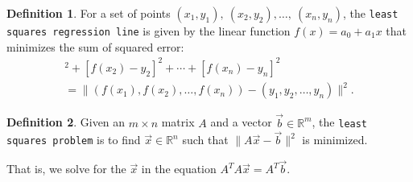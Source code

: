 \documentclass{beamer}
\newcommand{\R}{\mathbb{R}}
\newcommand{\fn}{\insertframenumber}
\theoremstyle{definition}
\newtheorem*{defn}{Definition}
\renewcommand{\emph}[1]{{\color{blue}\texttt{#1}}}
\begin{document}
\begin{frame}{\fn}
\begin{defn}
	For a set of points $(x_1,y_1),\ (x_2,y_2),\dots,\ (x_n,y_n)$, the \emph{least squares regression line} is given by the linear function $f(x)=a_0+a_1x$ that minimizes the sum of squared error:
	\begin{multline*}
	[f(x_1)-y_1]^2+[f(x_2)-y_2]^2+\cdots+[f(x_n)-y_n]^2\\=\|(f(x_1),f(x_2),\dots,f(x_n))-(y_1,y_2,\dots,y_n)\|^2.
	\end{multline*}
\end{defn}
\begin{defn}
	Given an $m\times n$ matrix $A$ and a vector $\vec b\in\R^m$, the \emph{least squares problem} is to find $\vec x\in\R^n$ such that $\|A\vec x-\vec b\|^2$ is minimized.
	
	That is, we solve for the $\vec x$ in the equation $A^TA\vec x=A^T\vec b$.
\end{defn}
\end{frame}
\end{document}
